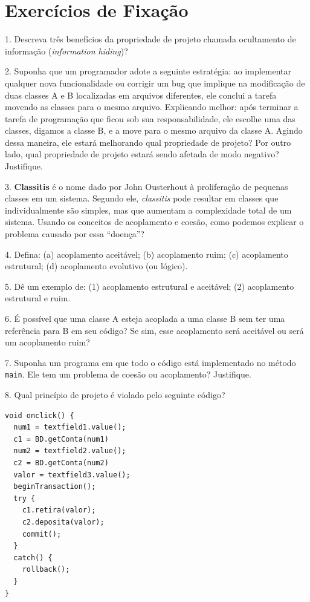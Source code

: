 \documentclass[
  11pt,
  twoside]{book}
\newcommand{\passthrough}[1]{#1}
\begin{document}
\hypertarget{exercuxedcios-de-fixauxe7uxe3o-4}{%
\section*{Exercícios de
Fixação}\label{exercuxedcios-de-fixauxe7uxe3o-4}}

1. Descreva três benefícios da propriedade de projeto chamada
ocultamento de informação (\emph{information hiding})?

2. Suponha que um programador adote a seguinte estratégia: ao
implementar qualquer nova funcionalidade ou corrigir um bug que implique
na modificação de duas classes A e B localizadas em arquivos diferentes,
ele conclui a tarefa movendo as classes para o mesmo arquivo. Explicando
melhor: após terminar a tarefa de programação que ficou sob sua
responsabilidade, ele escolhe uma das classes, digamos a classe B, e a
move para o mesmo arquivo da classe A. Agindo dessa maneira, ele estará
melhorando qual propriedade de projeto? Por outro lado, qual propriedade
de projeto estará sendo afetada de modo negativo? Justifique.

3. \textbf{Classitis} é o nome dado por John Ousterhout
 à proliferação de pequenas classes em um
sistema. Segundo ele, \emph{classitis} pode resultar em classes que
individualmente são simples, mas que aumentam a complexidade total de um
sistema. Usando os conceitos de acoplamento e coesão, como podemos
explicar o problema causado por essa ``doença''?

4. Defina: (a) acoplamento aceitável; (b) acoplamento ruim; (c)
acoplamento estrutural; (d) acoplamento evolutivo (ou lógico).

5. Dê um exemplo de: (1) acoplamento estrutural e aceitável; (2)
acoplamento estrutural e ruim.

6. É possível que uma classe A esteja acoplada a uma classe B sem ter
uma referência para B em seu código? Se sim, esse acoplamento será
aceitável ou será um acoplamento ruim?

7. Suponha um programa em que todo o código está implementado no método
\passthrough{\lstinline!main!}. Ele tem um problema de coesão ou
acoplamento? Justifique.

8. Qual princípio de projeto é violado pelo seguinte código?

\begin{lstlisting}
void onclick() {
  num1 = textfield1.value();
  c1 = BD.getConta(num1)
  num2 = textfield2.value();
  c2 = BD.getConta(num2)
  valor = textfield3.value();
  beginTransaction();
  try {
    c1.retira(valor);
    c2.deposita(valor);
    commit();
  }          
  catch() {
    rollback();
  }
}  
\end{lstlisting}
\end{document}
